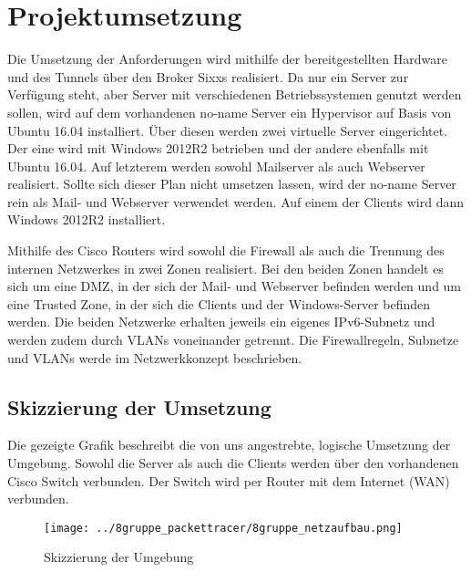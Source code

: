 \section{Projektumsetzung}

Die Umsetzung der Anforderungen wird mithilfe der bereitgestellten Hardware und des Tunnels über den Broker Sixxs realisiert. Da nur ein Server zur Verfügung steht, aber Server mit verschiedenen Betriebssystemen genutzt werden sollen, wird auf dem vorhandenen no-name Server ein Hypervisor auf Basis von Ubuntu 16.04 installiert. Über diesen werden zwei virtuelle Server eingerichtet. Der eine wird mit Windows 2012R2 betrieben und der andere ebenfalls mit Ubuntu 16.04. Auf letzterem werden sowohl Mailserver als auch Webserver realisiert. Sollte sich dieser Plan nicht umsetzen lassen, wird der no-name Server rein als Mail- und Webserver verwendet werden. Auf einem der Clients wird dann Windows 2012R2 installiert.

Mithilfe des Cisco Routers wird sowohl die Firewall als auch die Trennung des internen Netzwerkes in zwei Zonen realisiert. Bei den beiden Zonen handelt es sich um eine DMZ, in der sich der Mail- und Webserver befinden werden und um eine Trusted Zone, in der sich die Clients und der Windows-Server befinden werden. Die beiden Netzwerke erhalten jeweils ein eigenes IPv6-Subnetz und werden zudem durch VLANs voneinander getrennt. Die Firewallregeln, Subnetze und VLANs werde im Netzwerkkonzept beschrieben.

\subsection{Skizzierung der Umsetzung}

Die gezeigte Grafik beschreibt die von uns angestrebte, logische Umsetzung der Umgebung. Sowohl die Server als auch die Clients werden über den vorhandenen Cisco Switch verbunden. Der Switch wird per Router mit dem Internet (WAN) verbunden.

\begin{figure}[h]
\texttt{[image: ../8gruppe\_packettracer/8gruppe\_netzaufbau.png]}
\label{skizzierung-umsetzung}
\caption{Skizzierung der Umgebung}
\end{figure}